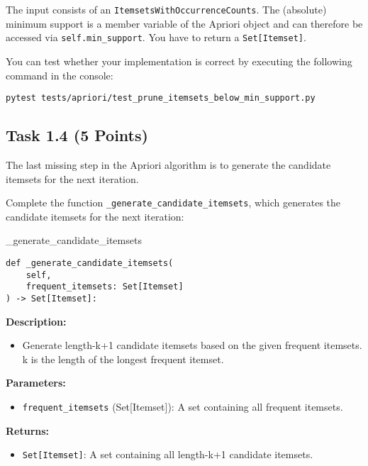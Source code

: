 \documentclass[
english,
smallborders
]{i6prcsht}
\newcommand{\points}[1]{\hfill \color{red}(#1 Points)\color{black}}
\begin{document}
\vspace*{0.5cm}

The input consists of an \texttt{ItemsetsWithOccurrenceCounts}. The (absolute) minimum support is a member variable of the Apriori object and can therefore be accessed via \texttt{self.min\_support}. You have to return a \texttt{Set[Itemset]}.

You can test whether your implementation is correct by executing the following command in the console:

\vspace*{0.3cm}

\begin{lstlisting}
pytest tests/apriori/test_prune_itemsets_below_min_support.py
\end{lstlisting}


\newpage 

\subsection*{Task 1.4 \points{5}}

The last missing step in the Apriori algorithm is to generate the candidate itemsets for the next iteration.

Complete the function \texttt{\_generate\_candidate\_itemsets}, which generates the candidate itemsets for the next iteration:

\vspace*{0.3cm}

\begin{functionbox}{\_generate\_candidate\_itemsets}
	\begin{lstlisting}[numbers=none]
def _generate_candidate_itemsets(
    self, 
    frequent_itemsets: Set[Itemset]
) -> Set[Itemset]:
\end{lstlisting}
	
	\textbf{Description:}
	\begin{itemize}[leftmargin=*,topsep=0pt]
		\item Generate length-k+1 candidate itemsets based on the given frequent itemsets. k is the length of the longest frequent itemset.
	\end{itemize}
	
	\textbf{Parameters:}
	\begin{itemize}[leftmargin=*,topsep=0pt]
		\item \texttt{frequent\_itemsets} (Set[Itemset]): A set containing all frequent itemsets.
	\end{itemize}
	
	\textbf{Returns:}
	\begin{itemize}[leftmargin=*,topsep=0pt]
		\item \texttt{Set[Itemset]}: A set containing all length-k+1 candidate itemsets.
	\end{itemize}
\end{functionbox}
\end{document}

